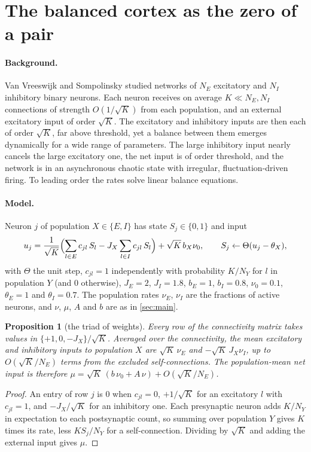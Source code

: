 \documentclass[11pt]{article}
\newtheorem{proposition}[theorem]{Proposition}
\theoremstyle{definition}\newtheorem{definition}[theorem]{Definition}
\theoremstyle{remark}\newtheorem{remark}[theorem]{Remark}
\begin{document}
\section{The balanced cortex as the zero of a pair}\label{sec:net}
\paragraph{Background.} Van Vreeswijk and Sompolinsky \cite{vVS96,vVS98} studied networks of $N_E$ excitatory and $N_I$ inhibitory binary neurons. Each neuron receives on average $K\ll N_E,N_I$ connections of strength $O(1/\sqrt K)$ from each population, and an external excitatory input of order $\sqrt K$. The excitatory and inhibitory inputs are then each of order $\sqrt K$, far above threshold, yet a balance between them emerges dynamically for a wide range of parameters. The large inhibitory input nearly cancels the large excitatory one, the net input is of order threshold, and the network is in an asynchronous chaotic state with irregular, fluctuation-driven firing. To leading order the rates solve linear balance equations.

\paragraph{Model.} Neuron $j$ of population $X\in\{E,I\}$ has state $S_j\in\{0,1\}$ and input
\[
u_j=\frac1{\sqrt K}\Bigl(\sum_{l\in E}c_{jl}\,S_l-J_X\sum_{l\in I}c_{jl}\,S_l\Bigr)+\sqrt K\,b_X\nu_0,
\qquad S_j\leftarrow\Theta(u_j-\theta_X),
\]
with $\Theta$ the unit step, $c_{jl}=1$ independently with probability $K/N_Y$ for $l$ in population $Y$ (and $0$ otherwise), $J_E=2$, $J_I=1.8$, $b_E=1$, $b_I=0.8$, $\nu_0=0.1$, $\theta_E=1$ and $\theta_I=0.7$. The population rates $\nu_E$, $\nu_I$ are the fractions of active neurons, and $\nu$, $\mu$, $A$ and $b$ are as in \cref{sec:main}.

\begin{proposition}[the triad of weights]\label{prop:triad}
Every row of the connectivity matrix takes values in $\{+1,0,-J_X\}/\sqrt K$. Averaged over the connectivity, the mean excitatory and inhibitory inputs to population $X$ are $\sqrt K\,\nu_E$ and $-\sqrt K\,J_X\nu_I$, up to $O(\sqrt K/N_E)$ terms from the excluded self-connections. The population-mean net input is therefore $\mu=\sqrt K\,(b\,\nu_0+A\,\nu)+O(\sqrt K/N_E)$.
\end{proposition}
\begin{proof}
An entry of row $j$ is $0$ when $c_{jl}=0$, $+1/\sqrt K$ for an excitatory $l$ with $c_{jl}=1$, and $-J_X/\sqrt K$ for an inhibitory one. Each presynaptic neuron adds $K/N_Y$ in expectation to each postsynaptic count, so summing over population $Y$ gives $K$ times its rate, less $KS_j/N_Y$ for a self-connection. Dividing by $\sqrt K$ and adding the external input gives $\mu$.
\end{proof}
\end{document}
